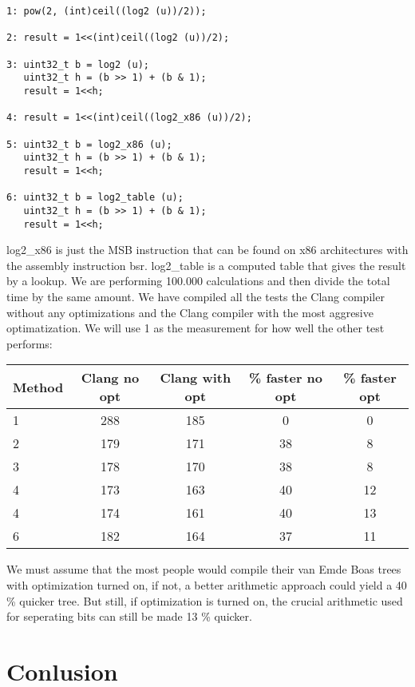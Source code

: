 \documentclass[oneside,11pt,openright]{report}
\begin{document}
\begin{lstlisting}
1: pow(2, (int)ceil((log2 (u))/2));

2: result = 1<<(int)ceil((log2 (u))/2);

3: uint32_t b = log2 (u);
   uint32_t h = (b >> 1) + (b & 1);
   result = 1<<h;

4: result = 1<<(int)ceil((log2_x86 (u))/2);

5: uint32_t b = log2_x86 (u);
   uint32_t h = (b >> 1) + (b & 1);
   result = 1<<h;

6: uint32_t b = log2_table (u);
   uint32_t h = (b >> 1) + (b & 1);
   result = 1<<h;

\end{lstlisting}

log2\_x86 is just the MSB instruction that can be found on x86 architectures with the assembly instruction bsr. log2\_table is a computed table that gives the result by a lookup. We are performing 100.000 calculations and then divide the total time by the same amount. We have compiled all the tests the Clang compiler without any optimizations and the Clang compiler with the most aggresive optimatization. We will use 1 as the measurement for how well the other test performs:

\begin{center}
  \begin{tabular}{ l | c | c | c | c }
    Method & Clang no opt & Clang with opt & \% faster no opt & \% faster opt  \\ \hline
    1 & 288 & 185 & 0 & 0 \\ 
    2 & 179 & 171 & 38 & 8\\ 
    3 & 178 & 170 & 38 & 8 \\ 
    4 & 173 & 163 & 40 & 12\\ 
    4 & 174 & 161 & 40 & 13 \\ 
    6 & 182 & 164 & 37 & 11 \\ 
  \end{tabular}
\end{center}

We must assume that the most people would compile their van Emde Boas trees with optimization turned on, if not, a better arithmetic approach could yield a 40 \% quicker tree. But still, if optimization is turned on, the crucial arithmetic used for seperating bits can still be made 13 \% quicker.

\chapter{Conlusion}
\end{document}
